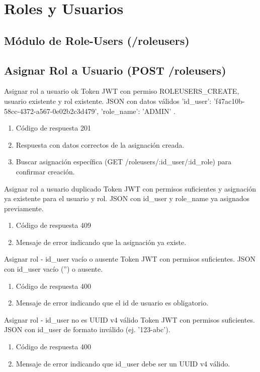 \section{Roles y Usuarios}
\subsection{Módulo de Role-Users (/roleusers)}

\subsection{Asignar Rol a Usuario (POST /roleusers)}

{Asignar rol a usuario ok}
{Token JWT con permiso ROLEUSERS\_CREATE, usuario existente y rol existente.}
{JSON con datos válidos { 'id\_user': 'f47ac10b-58cc-4372-a567-0e02b2c3d479', 'role\_name': 'ADMIN' }.}
{\begin{enumerate} [leftmargin=*, nosep]
    \item Código de respuesta 201
    \item Respuesta con datos correctos de la asignación creada.
    \item Buscar asignación específica (GET /roleusers/:id\_user/:id\_role) para confirmar creación.
\end{enumerate}}

{Asignar rol a usuario duplicado}
{Token JWT con permisos suficientes y asignación ya existente para el usuario y rol.}
{JSON con id\_user y role\_name ya asignados previamente.}
{\begin{enumerate} [leftmargin=*, nosep]
    \item Código de respuesta 409
    \item Mensaje de error indicando que la asignación ya existe.
\end{enumerate}}

{Asignar rol - id\_user vacío o ausente}
{Token JWT con permisos suficientes.}
{JSON con id\_user vacío ('') o ausente.}
{\begin{enumerate} [leftmargin=*, nosep]
    \item Código de respuesta 400
    \item Mensaje de error indicando que el id de usuario es obligatorio.
\end{enumerate}}

{Asignar rol - id\_user no es UUID v4 válido}
{Token JWT con permisos suficientes.}
{JSON con id\_user de formato inválido (ej. '123-abc').}
{\begin{enumerate} [leftmargin=*, nosep]
    \item Código de respuesta 400
    \item Mensaje de error indicando que id\_user debe ser un UUID v4 válido.
\end{enumerate}}

